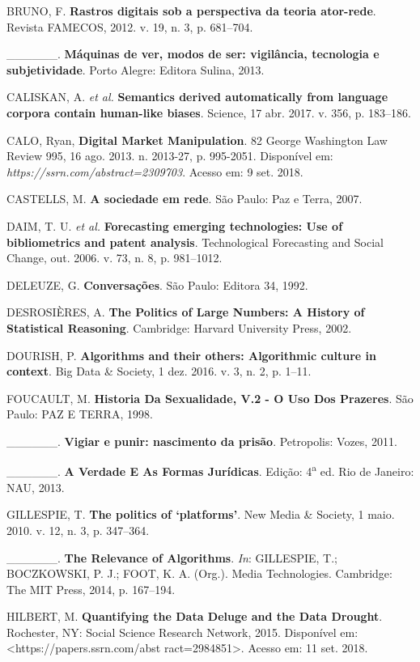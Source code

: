 BRUNO, F. \textbf{Rastros digitais sob a perspectiva da teoria
ator-rede}. Revista FAMECOS, 2012. v. 19, n. 3, p. 681--704.

\_\_\_\_\_\_. \textbf{Máquinas de ver, modos de ser: vigilância,
tecnologia e subjetividade}. Porto Alegre: Editora Sulina, 2013.

CALISKAN, A. \emph{et al.} \textbf{Semantics derived automatically from
language corpora contain human-like biases}. Science, 17 abr. 2017. v.
356, p. 183--186.

CALO, Ryan, \textbf{Digital Market Manipulation}. 82 George Washington
Law Review 995, 16 ago. 2013. n. 2013-27, p. 995-2051. Disponível em:
\emph{https://ssrn.com/abstract=2309703}. Acesso em: 9 set. 2018.

CASTELLS, M. \textbf{A sociedade em rede}. São Paulo: Paz e Terra, 2007.

DAIM, T. U. \emph{et al.} \textbf{Forecasting emerging technologies: Use
of bibliometrics and patent analysis}. Technological Forecasting and
Social Change, out. 2006. v. 73, n. 8, p. 981--1012.

DELEUZE, G. \textbf{Conversações}. São Paulo: Editora 34, 1992.

DESROSIÈRES, A. \textbf{The Politics of Large Numbers: A History of
Statistical Reasoning}. Cambridge: Harvard University Press, 2002.

DOURISH, P. \textbf{Algorithms and their others: Algorithmic culture in
context}. Big Data \& Society, 1 dez. 2016. v. 3, n. 2, p. 1--11.

FOUCAULT, M. \textbf{Historia Da Sexualidade, V.2 - O Uso Dos Prazeres}.
São Paulo: PAZ E TERRA, 1998.

\_\_\_\_\_\_. \textbf{Vigiar e punir: nascimento da prisão}. Petropolis:
Vozes, 2011.

\_\_\_\_\_\_. \textbf{A Verdade E As Formas Jurídicas}. Edição:
4\textsuperscript{a} ed. Rio de Janeiro: NAU, 2013.

GILLESPIE, T. \textbf{The politics of `platforms'}. New Media \&
Society, 1 maio. 2010. v. 12, n. 3, p. 347--364.

\_\_\_\_\_\_. \textbf{The Relevance of Algorithms}. \emph{In}:
GILLESPIE, T.; BOCZKOWSKI, P. J.; FOOT, K. A. (Org.). Media
Technologies. Cambridge: The MIT Press, 2014, p. 167--194.

HILBERT, M. \textbf{Quantifying the Data Deluge and the Data Drought}.
Rochester, NY: Social Science Research Network, 2015. Disponível em:
\textless{}https://papers.ssrn.com/abst
ract=2984851\textgreater{}.
Acesso em: 11 set. 2018.

